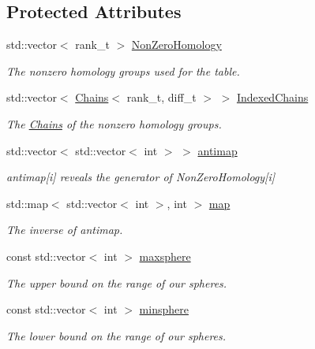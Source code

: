 \subsection*{Protected Attributes}
\begin{DoxyCompactItemize}
\item 
std\+::vector$<$ rank\+\_\+t $>$ \hyperlink{classMackey_1_1TableInput_a1f61296eba16c62517e325d21e7a5505}{Non\+Zero\+Homology}
\begin{DoxyCompactList}\small\item\em The nonzero homology groups used for the table. \end{DoxyCompactList}\item 
std\+::vector$<$ \hyperlink{classMackey_1_1Chains}{Chains}$<$ rank\+\_\+t, diff\+\_\+t $>$ $>$ \hyperlink{classMackey_1_1TableInput_aa612b7b41454848c19d3192ab6211ee4}{Indexed\+Chains}
\begin{DoxyCompactList}\small\item\em The \hyperlink{classMackey_1_1Chains}{Chains} of the nonzero homology groups. \end{DoxyCompactList}\item 
std\+::vector$<$ std\+::vector$<$ int $>$ $>$ \hyperlink{classMackey_1_1TableInput_ad85c480708a6b1a3e43725f10c818554}{antimap}
\begin{DoxyCompactList}\small\item\em antimap\mbox{[}i\mbox{]} reveals the generator of Non\+Zero\+Homology\mbox{[}i\mbox{]} \end{DoxyCompactList}\item 
std\+::map$<$ std\+::vector$<$ int $>$, int $>$ \hyperlink{classMackey_1_1TableInput_abf72738d5aee3a185548d8a4db232ea4}{map}
\begin{DoxyCompactList}\small\item\em The inverse of antimap. \end{DoxyCompactList}\item 
const std\+::vector$<$ int $>$ \hyperlink{classMackey_1_1TableInput_a56448ebdfecb95da4c52349d4ccbf576}{maxsphere}
\begin{DoxyCompactList}\small\item\em The upper bound on the range of our spheres. \end{DoxyCompactList}\item 
const std\+::vector$<$ int $>$ \hyperlink{classMackey_1_1TableInput_a3f4bf3973cebe4bc2d305d111fa8b478}{minsphere}
\begin{DoxyCompactList}\small\item\em The lower bound on the range of our spheres. \end{DoxyCompactList}\end{DoxyCompactItemize}


